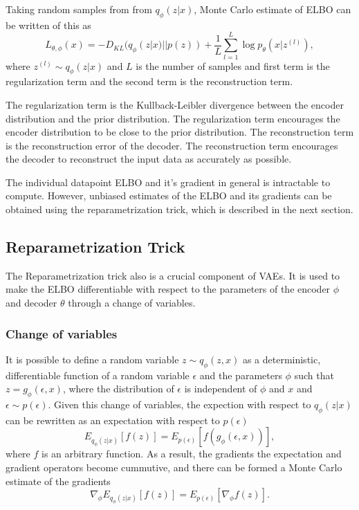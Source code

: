 Taking random samples from from $q_{\phi}(z|x)$, Monte Carlo estimate of ELBO can be written of this as
\[ L_{\theta, \phi}(x) = - D_{KL}(q_{\phi}(z|x) || p(z)) + \frac{1}{L} \sum_{l=1}^{L} \log p_{\theta}(x|z^{(l)}) ,\]
where $z^{(l)} \sim q_{\phi}(z|x)$ and $L$ is the number of samples and first term is the regularization term and the second term is the reconstruction term\cite{Kingma_2019}. 

The regularization term is the Kullback-Leibler divergence between the encoder distribution and the prior distribution. The regularization term encourages the encoder distribution to be close to the prior distribution. The reconstruction term is the reconstruction error of the decoder. The reconstruction term encourages the decoder to reconstruct the input data as accurately as possible.

The individual datapoint ELBO and it's gradient in general is intractable to compute. However, unbiased estimates of the ELBO and its gradients can be obtained using the reparametrization trick, which is described in the next section\cite{Kingma_2019}.


\subsection{Reparametrization Trick}

The Reparametrization trick also  is a crucial component of VAEs. It is used to make the ELBO differentiable with respect to the parameters of the encoder $\phi$ and decoder $\theta$ through a change of variables.\cite{Kingma_2019}

\subsubsection{Change of variables}

It is possible to define a random variable $z \sim q_{\phi}(z,x)$ as a deterministic, differentiable function of a random variable $\epsilon$ and the parameters $\phi$ such that $z = g_{\phi}(\epsilon, x)$, where the distribution of $\epsilon$ is independent of $\phi$ and $x$ and $\epsilon \sim p(\epsilon)$. Given this change of variables, the expection with respect to $q_{\phi}(z|x)$ can be rewritten as an expectation with respect to $p(\epsilon)$
\[ E_{q_{\phi}(z|x)}[f(z)] = E_{p(\epsilon)}[f(g_{\phi}(\epsilon, x))], \]
where $f$ is an arbitrary function.\cite{Kingma_2019}
As a result, the gradients the expectation and gradient operators become cummutive, and there can be formed a Monte Carlo estimate of the gradients
\[ \nabla_{\phi} E_{q_{\phi}(z|x)}[f(z)] = E_{p(\epsilon)}[\nabla_{\phi} f(z)]. \]




